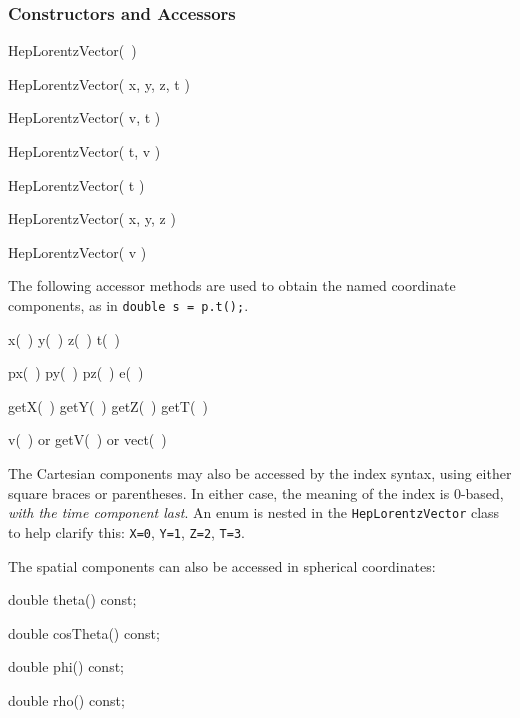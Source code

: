 \subsubsection{Constructors and Accessors}

\begin{shortlist}
  \item HepLorentzVector(~)
  \item HepLorentzVector( x, y, z, t )
  \item HepLorentzVector( v, t )
  \item HepLorentzVector( t, v )
  \item HepLorentzVector( t )
  \item HepLorentzVector( x, y, z )
  \item HepLorentzVector( v )
\end{shortlist}

\noindent
The following accessor methods are used
to obtain the named coordinate components,
as in \verb|double s = p.t();|.
\begin{shortlist}
  \item x(~) \/\/\/ y(~) \/\/\/ z(~) \/\/\/ t(~)
  \item px(~) \/\/\/ py(~) \/\/\/ pz(~) \/\/\/ e(~)
  \item getX(~) \/\/\/ getY(~) \/\/\/ getZ(~) \/\/\/ getT(~)
  \item v(~) or getV(~) or vect(~)
\end{shortlist}


\noindent
The Cartesian components may also be accessed by the index syntax, 
using either square braces or parentheses.  
In either case, the meaning of the index is 0-based, {\em with the
time component last}.
An enum is nested in the {\tt HepLorentzVector} class to help clarify this: 
{\tt X=0}, {\tt Y=1}, {\tt Z=2}, {\tt T=3}.

The spatial components can also be accessed in spherical coordinates:
\begin{shortlist}
  \item double theta() const;
  \item double cosTheta() const;
  \item double phi() const;
  \item double rho() const;
\end{shortlist}


